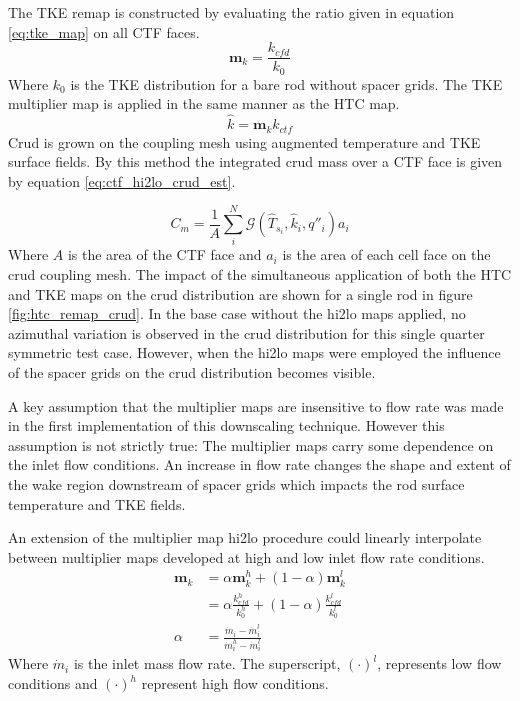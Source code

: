     The TKE remap is constructed by evaluating the ratio given in equation \ref{eq:tke_map} on all CTF faces.
    \begin{equation}
       \mathbf m_{k} = \frac{k_{cfd}}{k_{0}}
       \label{eq:tke_map}
    \end{equation}
    Where $k_0$ is the TKE distribution for a bare rod without spacer grids.
    The TKE multiplier map is applied in the same manner as the HTC map.
       \begin{equation}
       \hat k = \mathbf m_k k_{ctf}
       \end{equation}
Crud is grown on the coupling mesh using augmented temperature and TKE surface fields. By this method the integrated crud mass over a CTF face is given by equation \ref{eq:ctf_hi2lo_crud_est}.

 \begin{equation}
     C_m = \frac{1}{A} \sum_i^N \mathcal G(\hat T_{s_i}, \hat k_i, q''_i) a_i
 \label{eq:ctf_hi2lo_crud_est}
 \end{equation}
Where $A$ is the area of the CTF face and $a_i$ is the area of each cell face on the crud coupling mesh.  The impact of the simultaneous application of both the HTC and TKE maps on the crud distribution are shown for a single rod in figure \ref{fig:htc_remap_crud}.  In the base case without the hi2lo maps applied, no azimuthal variation is observed in the crud distribution for this single quarter symmetric test case.  However, when the hi2lo maps were employed the influence of the spacer grids on the crud distribution becomes visible.  

A key assumption that the multiplier maps are insensitive to flow rate was made in the first implementation of this downscaling technique.  However this assumption is not strictly true: The multiplier maps carry some dependence on the inlet flow conditions.  An increase in flow rate changes the shape and extent of the wake region downstream of spacer grids which impacts the rod surface temperature and TKE fields.

    An extension of the multiplier map hi2lo procedure could linearly interpolate between multiplier maps developed at high and low inlet flow rate conditions.
    \begin{align*}
        \mathbf m_k &= \alpha \mathbf m_k^h + (1 - \alpha) \mathbf m_k^l \\
                    &= \alpha \frac{k^h_{cfd}}{k^h_0} + (1 - \alpha) \frac{k^l_{cfd}}{k^l_0} \\
        \alpha & = \frac{\dot m_i - \dot m_i^l }{\dot m_i^h - \dot m_i^l}
    \end{align*}
    Where $\dot m_i$ is the inlet mass flow rate.  The superscript, $(\cdot)^l$, represents low flow conditions and $(\cdot)^h$ represent high flow conditions.



